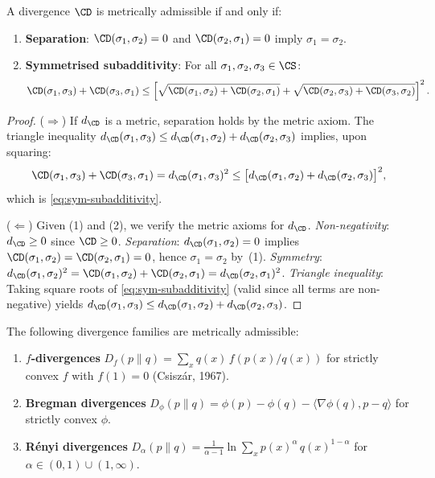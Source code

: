 \begin{theorem}\label{thm:15.1}
A divergence $\CD$ is metrically admissible if and only if:
\begin{enumerate}
  \item \textbf{Separation}: $\CD(\sigma_1, \sigma_2) = 0$ and
        $\CD(\sigma_2, \sigma_1) = 0$ imply $\sigma_1 = \sigma_2$.
  \item \textbf{Symmetrised subadditivity}: For all
        $\sigma_1, \sigma_2, \sigma_3 \in \CS$:
        \begin{equation}\label{eq:sym-subadditivity}
          \CD(\sigma_1, \sigma_3) + \CD(\sigma_3, \sigma_1)
          \leq \left[\sqrt{\CD(\sigma_1, \sigma_2) + \CD(\sigma_2, \sigma_1)}
          + \sqrt{\CD(\sigma_2, \sigma_3) + \CD(\sigma_3, \sigma_2)}
          \right]^2.
        \end{equation}
\end{enumerate}
\end{theorem}

\begin{proof}
($\Rightarrow$) If $d_{\CD}$ is a metric, separation holds by the
metric axiom.  The triangle inequality
$d_{\CD}(\sigma_1, \sigma_3) \leq d_{\CD}(\sigma_1, \sigma_2) +
d_{\CD}(\sigma_2, \sigma_3)$ implies, upon squaring:
\[
  \CD(\sigma_1, \sigma_3) + \CD(\sigma_3, \sigma_1)
  = d_{\CD}(\sigma_1, \sigma_3)^2
  \leq \big[d_{\CD}(\sigma_1, \sigma_2) +
  d_{\CD}(\sigma_2, \sigma_3)\big]^2,
\]
which is \eqref{eq:sym-subadditivity}.

($\Leftarrow$) Given (1) and (2), we verify the metric axioms for
$d_{\CD}$.
\emph{Non-negativity}: $d_{\CD} \geq 0$ since $\CD \geq 0$.
\emph{Separation}: $d_{\CD}(\sigma_1, \sigma_2) = 0$ implies
$\CD(\sigma_1, \sigma_2) = \CD(\sigma_2, \sigma_1) = 0$, hence
$\sigma_1 = \sigma_2$ by~(1).
\emph{Symmetry}: $d_{\CD}(\sigma_1, \sigma_2)^2 =
\CD(\sigma_1, \sigma_2) + \CD(\sigma_2, \sigma_1) =
d_{\CD}(\sigma_2, \sigma_1)^2$.
\emph{Triangle inequality}: Taking square roots of
\eqref{eq:sym-subadditivity} (valid since all terms are non-negative)
yields $d_{\CD}(\sigma_1, \sigma_3) \leq d_{\CD}(\sigma_1, \sigma_2) +
d_{\CD}(\sigma_2, \sigma_3)$.
\end{proof}

\begin{corollary}
\label{cor:15.1}
The following divergence families are metrically admissible:
\begin{enumerate}
  \item \textbf{$f$-divergences} $D_f(p \| q) = \sum_x q(x)\,
        f(p(x)/q(x))$ for strictly convex $f$ with $f(1) = 0$
        (Csisz\'ar, 1967).
  \item \textbf{Bregman divergences}
        $D_\phi(p \| q) = \phi(p) - \phi(q) - \langle \nabla\phi(q),
        p - q \rangle$ for strictly convex $\phi$.
  \item \textbf{R\'enyi divergences}
        $D_\alpha(p \| q) = \frac{1}{\alpha - 1}
        \ln \sum_x p(x)^\alpha\,q(x)^{1-\alpha}$ for
        $\alpha \in (0, 1) \cup (1, \infty)$.
\end{enumerate}
\end{corollary}

